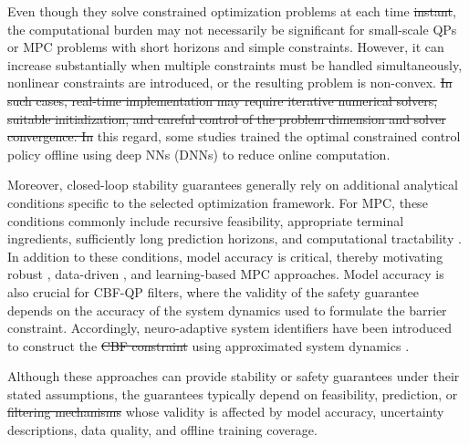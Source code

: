 \documentclass[letterpaper, journal]{IEEEtran}
\providecommand{\DIFadd}[1]{{\protect\color{blue}\uwave{#1}}} %
\providecommand{\DIFdel}[1]{{\protect\color{red}\sout{#1}}} %
\providecommand{\DIFaddbegin}{} %
\providecommand{\DIFaddend}{} %
\providecommand{\DIFdelbegin}{} %
\providecommand{\DIFdelend}{} %
\begin{document}
Even though they solve constrained optimization problems at each time \DIFdelbegin \DIFdel{instant}\DIFdelend \DIFaddbegin \DIFadd{step}\DIFaddend , the computational burden may not necessarily be significant for small-scale QPs or MPC problems with short horizons and simple constraints.
However, it can increase substantially when multiple constraints must be handled simultaneously, nonlinear constraints are introduced, or the resulting problem is non-convex.
\DIFdelbegin \DIFdel{In such cases, real-time implementation may require iterative numerical solvers, suitable initialization, and careful control of the problem dimension and solver convergence.
In }\DIFdelend %
\DIFaddbegin \DIFadd{In }\DIFaddend this regard, some studies \cite{Vahidi-Moghaddam:2025aa,Mallick:2025aa,Khodaverdian:2025aa} trained the optimal constrained control policy offline using deep NNs (DNNs) to reduce online computation.

Moreover, closed-loop stability guarantees generally rely on additional analytical conditions specific to the selected optimization framework.
For MPC, these conditions commonly include recursive feasibility, appropriate terminal ingredients, sufficiently long prediction horizons, and computational tractability \cite{Greune:2011aa}.
In addition to these conditions, model accuracy is critical, thereby motivating robust \cite{Bemporad:1999aa}, data-driven \cite{Berberich:2025aa}, and learning-based MPC \cite{Draeger:1995aa,Vahidi-Moghaddam:2025aa} approaches.
Model accuracy is also crucial for CBF-QP filters, where the validity of the safety guarantee depends on the accuracy of the system dynamics used to formulate the barrier constraint.
Accordingly, neuro-adaptive system identifiers have been introduced to construct the \DIFdelbegin \DIFdel{CBF constraint }\DIFdelend \DIFaddbegin \DIFadd{CBF-QP filters }\DIFaddend using approximated system dynamics \cite{Sweatland:2025aa}.

Although these approaches can provide stability or safety guarantees under their stated assumptions, the guarantees typically depend on feasibility, prediction, or \DIFdelbegin \DIFdel{filtering mechanisms }\DIFdelend \DIFaddbegin \DIFadd{safety-critical filters }\DIFaddend whose validity is affected by model accuracy, uncertainty descriptions, data quality, and offline training coverage.
\end{document}
